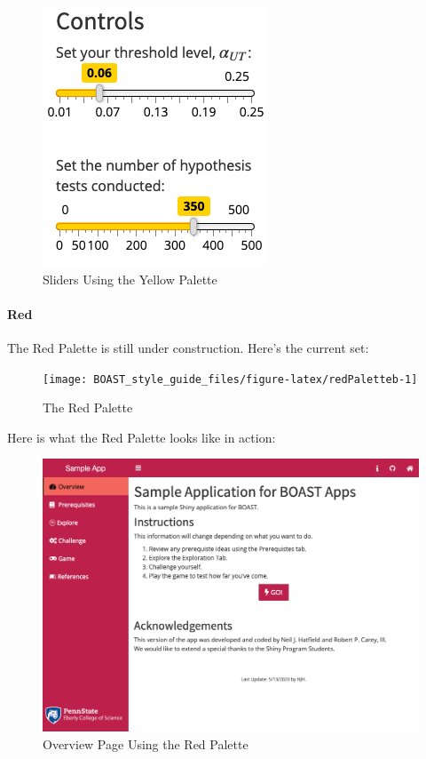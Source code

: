 \documentclass[
]{book}
\begin{document}
\begin{figure}

{\centering \includegraphics{images/colorThemes/yellowSliders} 

}

\caption{Sliders Using the Yellow Palette}\label{fig:yellowAction3b}
\end{figure}

\hypertarget{red-1}{%
\paragraph{Red}\label{red-1}}

The Red Palette is still under construction. Here's the current set:

\begin{figure}

{\centering \texttt{[image: BOAST\_style\_guide\_files/figure-latex/redPaletteb-1]} 

}

\caption{The Red Palette}\label{fig:redPaletteb}
\end{figure}

Here is what the Red Palette looks like in action:

\begin{figure}

{\centering \includegraphics[width=14in]{images/colorThemes/redOverview} 

}

\caption{Overview Page Using the Red Palette}\label{fig:redAction1b}
\end{figure}
\end{document}
